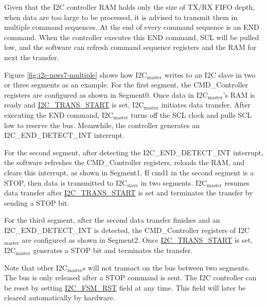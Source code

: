 \documentclass[main\_\_EN.tex]{subfiles}
\begin{document}
Given that the I2C controller RAM holds only the size of TX/RX FIFO depth, when data are too large to be processed, it is advised to transmit them in multiple command sequences. At the end of every command sequence is an END command. When the controller executes this END command, SCL will be pulled low, and the software can refresh command sequence registers and the RAM for next the transfer.

Figure \ref{fig:i2c-mws7-multiple} shows how I2C$_\text{master}$ writes to an I2C slave in two or three segments as an example. For the first segment, the CMD\_Controller registers are configured as shown in Segment0. Once data in I2C$_\text{master}$'s RAM is ready and \hyperref[fielddesc:I2CTRANSSTART]{I2C\_TRANS\_START} is set, I2C$_\text{master}$ initiates data transfer. After executing the END command, I2C$_\text{master}$ turns off the SCL clock and pulls SCL low to reserve the bus. Meanwhile, the controller generates an I2C\_END\_DETECT\_INT interrupt.

For the second segment, after detecting the I2C\_END\_DETECT\_INT interrupt, the software refreshes the CMD\_Controller registers, reloads the RAM, and clears this interrupt, as shown in Segment1. If cmd1 in the second segment is a STOP, then data is transmitted to I2C$_\text{slave}$ in two segments. I2C$_\text{master}$ resumes data transfer after \hyperref[fielddesc:I2CTRANSSTART]{I2C\_TRANS\_START} is set and terminates the transfer by sending a STOP bit.

For the third segment, after the second data transfer finishes and an I2C\_END\_DETECT\_INT is detected, the CMD\_Controller registers of I2C$_\text{master}$ are configured as shown in Segment2. Once \hyperref[fielddesc:I2CTRANSSTART]{I2C\_TRANS\_START} is set, I2C$_\text{master}$ generates a STOP bit and terminates the transfer. 

Note that other I2C$_\text{master}$s will not transact on the bus between two segments. The bus is only released after a STOP command is sent. The I2C controller can be reset by setting \hyperref[fielddesc:I2CFSMRST]{I2C\_FSM\_RST} field at any time. This field will later be cleared automatically by hardware.
\end{document}
